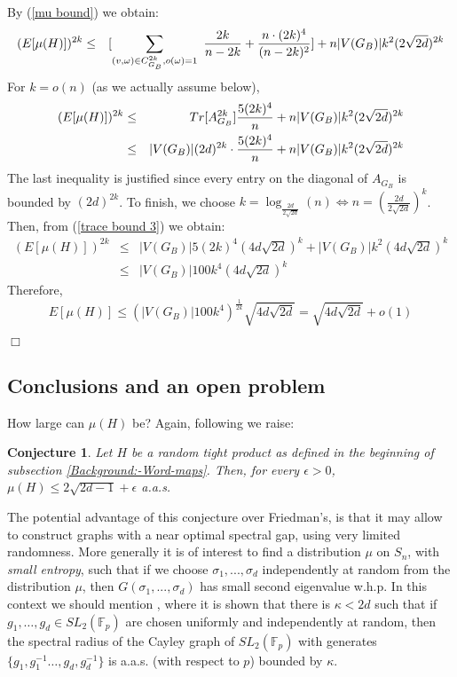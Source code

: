 \documentclass[12pt]{article}
\newtheorem{open question}[theorem]{Open question}
\newtheorem{conjecture}[theorem]{Conjecture}
\newcommand{\proofbox}{\begin{flushright}$\Box$\end{flushright}}
\begin{document}
By (\ref{mu bound}) we obtain:
\begin{eqnarray*}
(E[\mu(H)])^{2k} &\le& [\sum_{(v,\omega) \in C_{G_B}^{2k},o(\omega)=1}\ \frac{2k}{n-2k}+\frac{n\cdot(2k)^4}{(n-2k)^2}]+n|V(G_B)|k^2(2\sqrt{2d})^{2k}\notag\\
\end{eqnarray*}
For $k=o(n)$ (as we actually assume below),
\begin{eqnarray}
(E[\mu(H)])^{2k} &\le& Tr[A_{G_B}^{2k}]\frac{5(2k)^4}{n}+n|V(G_B)|k^2(2\sqrt{2d})^{2k}\notag\\
&\le& |V(G_B)|(2d)^{2k}\cdot\frac{5(2k)^4}{n}+n|V(G_B)|k^2(2\sqrt{2d})^{2k}\label{trace bound 3}
\end{eqnarray}
The last inequality is justified since every entry on the diagonal of $A_{G_B}$ is bounded by $(2d)^{2k}$.
To finish, we choose $k=\log_{\frac{2d}{2\sqrt{2d}}}(n)\iff n=(\frac{2d}{2\sqrt{2d}})^k$. Then, from (\ref{trace bound 3}) we obtain:
\begin{eqnarray*}
(E[\mu(H)])^{2k} &\le& |V(G_B)|5(2k)^4(4d\sqrt{2d})^k+|V(G_B)|k^2(4d\sqrt{2d})^k\\
&\le& |V(G_B)|100k^4(4d\sqrt{2d})^k
\end{eqnarray*}
Therefore,
$$E[\mu(H)] \le (|V(G_B)|100k^4)^{\frac{1}{2k}}\sqrt{4d\sqrt{2d}}=\sqrt{4d\sqrt{2d}}+o(1)$$
\proofbox

\subsection{Conclusions and an open problem}
How large can $\mu(H)$ be? Again, following \cite{Fri03} we raise:
\begin{conjecture}
Let $H$ be a random tight product as defined in the beginning of subsection \ref{Background:-Word-maps}. Then, for every $\epsilon > 0$, $\mu(H) \le 2\sqrt{2d-1}+\epsilon$ a.a.s.
\end{conjecture}
The potential advantage of this conjecture over Friedman's, is that it may allow to construct graphs with a near optimal spectral gap, using very limited randomness. More generally it is of interest to
find a distribution $\mu$ on $S_n$, with {\em small entropy}, such that if we choose $\sigma_1,...,\sigma_d$ independently at random from the distribution $\mu$, then $G(\sigma_1,...,\sigma_d)$ has small second eigenvalue w.h.p.
In this context we should mention
\cite{BG08}, where it is shown that there is $\kappa < 2d$ such that if 
$g_1,\ldots,g_d\in SL_2(\mathbb F_p)$ are chosen uniformly and independently at random, then the spectral radius of the Cayley graph of $SL_2(\mathbb F_p)$
with generates $\{g_1,g_1^{-1}\ldots,g_d,g_d^{-1}\}$ is a.a.s. (with respect to $p$) bounded by $\kappa$.
\end{document}
